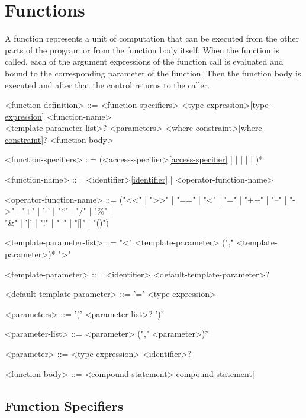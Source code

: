 \documentclass[a4paper,oneside,11pt]{article}
\begin{document}
\section{Functions}

A function represents a unit of computation that can be executed from the other parts of the program or from the function body itself.
When the function is called, each of the argument expressions of the function call is evaluated and bound to the corresponding parameter of the function.
Then the function body is executed and after that the control returns to the caller.

\begin{grammar}
\label{function-definition}<function-definition> ::= <function-specifiers> <type-expression>\ref{type-expression} <function-name>\\
<template-parameter-list>? <parameters> <where-constraint>\ref{where-constraint}? <function-body>

<function-specifiers> ::= (<access-specifier>\ref{access-specifier} |  |  |  |  | )*

\label{function-name}<function-name> ::= <identifier>\ref{identifier} | <operator-function-name>

<operator-function-name> ::=  ("<<" | ">>" | "==" | "<" | "=" | "++" | "--" | "->" | "+" | '-' | "*" | "/" | "\%" |\\
"\&" | '|' | "!" | "~" | "[]" | "()")

\label{template-parameter-list}<template-parameter-list> ::= "<" <template-parameter>  ("," <template-parameter>)* ">"

<template-parameter> ::= <identifier> <default-template-parameter>?

<default-template-parameter> ::= '=' <type-expression>

\label{parameters}<parameters> ::= '(' <parameter-list>? ')'

\label{parameter-list}<parameter-list> ::= <parameter> ("," <parameter>)*

<parameter> ::= <type-expression> <identifier>?

\label{function-body}<function-body> ::= <compound-statement>\ref{compound-statement}

\end{grammar}

\subsection{Function Specifiers}
\end{document}
